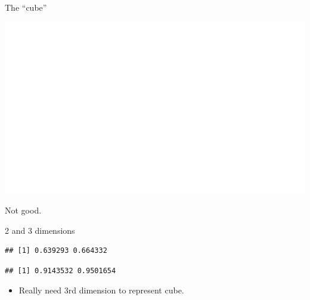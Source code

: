 \begin{frame}[fragile]{The ``cube''}
 
\begin{knitrout}
\color{fgcolor}
\includegraphics[width=\maxwidth]{figure/bianconeri-1} 

\end{knitrout}

Not good.
  
  
  
\end{frame}


\begin{frame}[fragile]{2 and 3 dimensions}
  
\begin{knitrout}
\color{fgcolor}\begin{kframe}
\begin{alltt}
\hlkwb{=}\hlstd{,}
\hlopt{$}
\end{alltt}
\begin{verbatim}
## [1] 0.639293 0.664332
\end{verbatim}
\begin{alltt}
\hlopt{$}
\end{alltt}
\begin{verbatim}
## [1] 0.9143532 0.9501654
\end{verbatim}
\end{kframe}
\end{knitrout}

\begin{itemize}
\item Really need 3rd dimension to represent cube.
\end{itemize}
  
\end{frame}


